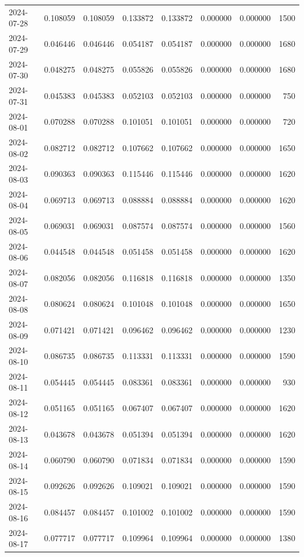 \begin{tabular}{lrrrrrrr}
2024-07-28 & 0.108059 & 0.108059 & 0.133872 & 0.133872 & 0.000000 & 0.000000 & 1500 \\
2024-07-29 & 0.046446 & 0.046446 & 0.054187 & 0.054187 & 0.000000 & 0.000000 & 1680 \\
2024-07-30 & 0.048275 & 0.048275 & 0.055826 & 0.055826 & 0.000000 & 0.000000 & 1680 \\
2024-07-31 & 0.045383 & 0.045383 & 0.052103 & 0.052103 & 0.000000 & 0.000000 & 750 \\
2024-08-01 & 0.070288 & 0.070288 & 0.101051 & 0.101051 & 0.000000 & 0.000000 & 720 \\
2024-08-02 & 0.082712 & 0.082712 & 0.107662 & 0.107662 & 0.000000 & 0.000000 & 1650 \\
2024-08-03 & 0.090363 & 0.090363 & 0.115446 & 0.115446 & 0.000000 & 0.000000 & 1620 \\
2024-08-04 & 0.069713 & 0.069713 & 0.088884 & 0.088884 & 0.000000 & 0.000000 & 1620 \\
2024-08-05 & 0.069031 & 0.069031 & 0.087574 & 0.087574 & 0.000000 & 0.000000 & 1560 \\
2024-08-06 & 0.044548 & 0.044548 & 0.051458 & 0.051458 & 0.000000 & 0.000000 & 1620 \\
2024-08-07 & 0.082056 & 0.082056 & 0.116818 & 0.116818 & 0.000000 & 0.000000 & 1350 \\
2024-08-08 & 0.080624 & 0.080624 & 0.101048 & 0.101048 & 0.000000 & 0.000000 & 1650 \\
2024-08-09 & 0.071421 & 0.071421 & 0.096462 & 0.096462 & 0.000000 & 0.000000 & 1230 \\
2024-08-10 & 0.086735 & 0.086735 & 0.113331 & 0.113331 & 0.000000 & 0.000000 & 1590 \\
2024-08-11 & 0.054445 & 0.054445 & 0.083361 & 0.083361 & 0.000000 & 0.000000 & 930 \\
2024-08-12 & 0.051165 & 0.051165 & 0.067407 & 0.067407 & 0.000000 & 0.000000 & 1620 \\
2024-08-13 & 0.043678 & 0.043678 & 0.051394 & 0.051394 & 0.000000 & 0.000000 & 1620 \\
2024-08-14 & 0.060790 & 0.060790 & 0.071834 & 0.071834 & 0.000000 & 0.000000 & 1590 \\
2024-08-15 & 0.092626 & 0.092626 & 0.109021 & 0.109021 & 0.000000 & 0.000000 & 1590 \\
2024-08-16 & 0.084457 & 0.084457 & 0.101002 & 0.101002 & 0.000000 & 0.000000 & 1590 \\
2024-08-17 & 0.077717 & 0.077717 & 0.109964 & 0.109964 & 0.000000 & 0.000000 & 1380 \\

\end{tabular}
